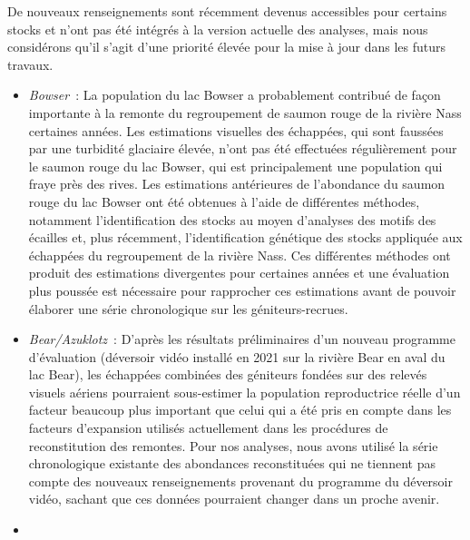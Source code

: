 \documentclass[french,11pt]{book}
\begin{document}
De nouveaux renseignements sont récemment devenus accessibles pour certains stocks et n'ont pas été intégrés à la version actuelle des analyses, mais nous considérons qu'il s'agit d'une priorité élevée pour la mise à jour dans les futurs travaux.
\begin{itemize}

\item
  \emph{Bowser}~: La population du lac Bowser a probablement contribué de façon importante à la remonte du regroupement de saumon rouge de la rivière Nass certaines années. Les estimations visuelles des échappées, qui sont faussées par une turbidité glaciaire élevée, n'ont pas été effectuées régulièrement pour le saumon rouge du lac Bowser, qui est principalement une population qui fraye près des rives. Les estimations antérieures de l'abondance du saumon rouge du lac Bowser ont été obtenues à l'aide de différentes méthodes, notamment l'identification des stocks au moyen d'analyses des motifs des écailles et, plus récemment, l'identification génétique des stocks appliquée aux échappées du regroupement de la rivière Nass. Ces différentes méthodes ont produit des estimations divergentes pour certaines années et une évaluation plus poussée est nécessaire pour rapprocher ces estimations avant de pouvoir élaborer une série chronologique sur les géniteurs-recrues.
\item
  \emph{Bear/Azuklotz}~: D'après les résultats préliminaires d'un nouveau programme d'évaluation (déversoir vidéo installé en 2021 sur la rivière Bear en aval du lac Bear), les échappées combinées des géniteurs fondées sur des relevés visuels aériens pourraient sous-estimer la population reproductrice réelle d'un facteur beaucoup plus important que celui qui a été pris en compte dans les facteurs d'expansion utilisés actuellement dans les procédures de reconstitution des remontes. Pour nos analyses, nous avons utilisé la série chronologique existante des abondances reconstituées qui ne tiennent pas compte des nouveaux renseignements provenant du programme du déversoir vidéo, sachant que ces données pourraient changer dans un proche avenir.
\item

\end{itemize}
\end{document}
